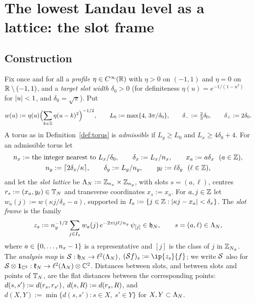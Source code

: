 \section{The lowest Landau level as a lattice: the slot frame}\label{sec:frame}

\subsection{Construction}

\begin{definition}\label{def:frame}
Fix once and for all a \emph{profile} $\eta\in C^\infty(\mathbb{R})$ with $\eta>0$ on $(-1,1)$ and $\eta=0$ on
$\mathbb{R}\setminus(-1,1)$, and a \emph{target slot width} $\delta_0>0$ (for definiteness $\eta(u)=e^{-1/(1-u^2)}$ for
$\lvert u\rvert<1$, and $\delta_0=\sqrt\pi$). Put
\[
w(u):=\eta(u)\Bigl(\sum_{k\in\mathbb{Z}}\eta(u-k)^2\Bigr)^{-1/2},\qquad L_0:=\max\{4,\,3\pi/\delta_0\},\qquad
\delta_-:=\tfrac23\delta_0,\qquad\delta_+:=2\delta_0 .
\]
A torus as in Definition~\ref{def:torus} is \emph{admissible} if $L_y\ge L_0$ and $L_x\ge4\delta_0+4$. For an
admissible torus let
\begin{gather*}
\nx:=\text{the integer nearest to }L_x/\delta_0,\qquad\delta_x:=L_x/\nx,\qquad x_a:=a\delta_x\ \ (a\in\Z),\\
\ny:=\lceil2\delta_x/\kappa\rceil,\qquad\delta_y:=L_y/\ny,\qquad y_\ell:=\ell\delta_y\ \ (\ell\in\Z),
\end{gather*}
and let the \emph{slot lattice} be $\Lambda_N:=\mathbb{Z}_{n_x}\times\mathbb{Z}_{n_y}$, with slots $s=(a,\ell)$, centres
$r_{s}:=(x_a,y_\ell)\in\mathbb{T}_N$ and transverse coordinates $x_s:=x_a$. For $a,j\in\mathbb{Z}$ let
$w_a(j):=w(\kappa j/\delta_x-a)$, supported in $I_a:=\{j\in\mathbb{Z}:\lvert\kappa j-x_a\rvert<\delta_x\}$. The \emph{slot frame}
is the family
\begin{equation}\label{eq:zs}
z_s:=n_y^{-1/2}\sum_{j\in I_a}w_a(j)\,e^{-2\pi\mathrm{i} j\ell/n_y}\,\psi_{[j]}\in\mathfrak{h}_N,\qquad s=(a,\ell)\in\Lambda_N,
\end{equation}
where $a\in\{0,\dots,n_x-1\}$ is a representative and $[j]$ is the class of $j$ in $\mathbb{Z}_{N_{\phi}}$. The
\emph{analysis map} is $\mathcal{S}:\mathfrak{h}_N\to\ell^2(\Lambda_N)$, $(\Sa f)_s:=\ip{z_s}{f}$; we write $\mathcal{S}$ also for
$\mathcal{S}\otimes\mathbf{1}_{\mathbb{C}^2}:\mathfrak{k}_N\to\ell^2(\Lambda_N)\otimes\mathbb{C}^2$. Distances between slots, and between slots and points
of $\mathbb{T}_N$, are the flat distances between the corresponding points: $d(s,s'):=d(r_{s},r_{s'})$,
$d(s,R):=d(r_{s},R)$, and $d(X,Y):=\min\{d(s,s'):s\in X,\ s'\in Y\}$ for $X,Y\subset\Lambda_N$.
\end{definition}

